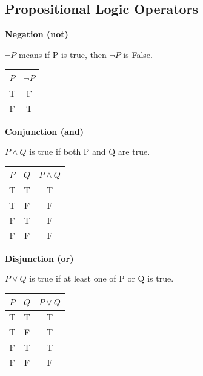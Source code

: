 \documentclass[12pt,letterpaper]{article} \usepackage{amsmath} \usepackage{graphicx}  \usepackage{longtable}  \usepackage{amssymb}
\begin{document}
        \subsection{Propositional Logic Operators}
            \begin{centering}
                \textbf{Negation (not)}
                
                $\neg P $ means if P is true, then  $\neg P$  is False.
        
                \vspace{6pt}
                \begin{tabular}{c|c}
                    \textbf{$P$} & \textbf{$\neg P$} \\
                    \hline
                    T & F \\
                    F & T \\
                \end{tabular}
        
                \textbf{Conjunction (and)}

                $P \land Q $ is true if both P and Q are true.
                
                \vspace{6pt}
                \begin{tabular}{c c|c}
                    \textbf{$P$} & \textbf{$Q$} & \textbf{$P \land Q$} \\
                    \hline
                    T & T & T \\
                    T & F & F \\
                    F & T & F \\
                    F & F & F \\
                \end{tabular}
        
                \textbf{Disjunction (or)}

                $P \lor Q $ is true if at least one of P or Q is true.
                
                \vspace{6pt}
                \begin{tabular}{c c|c}
                    \textbf{$P$} & \textbf{$Q$} & \textbf{$P \lor Q$} \\
                    \hline
                    T & T & T \\
                    T & F & T \\
                    F & T & T \\
                    F & F & F \\
                \end{tabular}
        

\end{centering}
\end{document}

